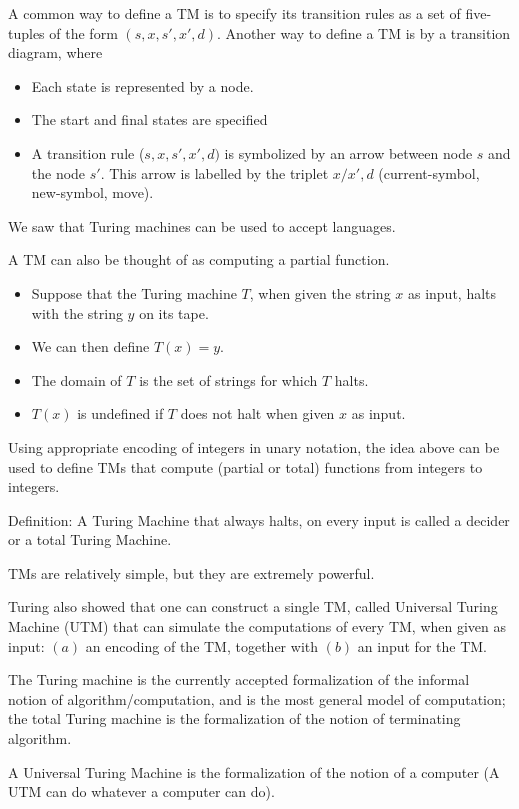 \documentclass{article}
\begin{document}
A common way to define a TM is to specify its transition rules as a set of five-tuples of the form $(s,x,s',x',d)$. Another way to define a TM is by a transition diagram, where
\begin{itemize}
    \item Each state is represented by a node.
    \item The start and final states are specified
    \item A transition rule ($s,x,s',x',d)$ is symbolized by an arrow between node $s$ and the node $s'$. This arrow is labelled by the triplet $x/x',d$ (current-symbol, new-symbol, move). 
\end{itemize}

We saw that Turing machines can be used to accept languages.

A TM can also be thought of as computing a partial function.
\begin{itemize}
    \item Suppose that the Turing machine $T$, when given the string $x$ as input, halts with the string $y$ on its tape.
    \item We can then define $T(x) = y$.
    \item The domain of $T$ is the set of strings for which $T$ halts.
    \item $T(x)$ is undefined if $T$ does not halt when given $x$ as input.
\end{itemize}

Using appropriate encoding of integers in unary notation, the idea above can be used to define TMs that compute (partial or total) functions from integers to integers.

Definition: A Turing Machine that always halts, on every input is called a decider or a total Turing Machine.

TMs are relatively simple, but they are extremely powerful.

Turing also showed that one can construct a single TM, called Universal Turing Machine (UTM) that can simulate the computations of every TM, when given as input: $(a)$ an encoding of the TM, together with $(b)$ an input for the TM.

The Turing machine is the currently accepted formalization of the informal notion of algorithm/computation, and is the most general model of computation; the total Turing machine is the formalization of the notion of terminating algorithm.

A Universal Turing Machine is the formalization of the notion of a computer (A UTM can do whatever a computer can do).
\end{document}
